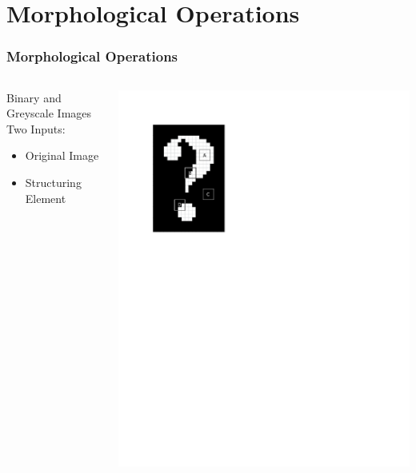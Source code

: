 \documentclass{beamer}
\begin{document}
\section[Morphological Operations]{Morphological Operations}

\begin{frame}
\frametitle{Morphological Operations}
\begin{columns}
\begin{column}{0.5\textwidth}
Binary and Greyscale Images
\linebreak
\linebreak
Two Inputs:
\begin{itemize}
\item Original Image
\item Structuring Element
\end{itemize}
\end{column}
\begin{column}{0.5\textwidth}
\includegraphics[width=1\textwidth,trim={0 6.5in 4in 0},clip]{structuring_element_placement}
\end{column}
\end{columns}
\end{frame}
\end{document}
